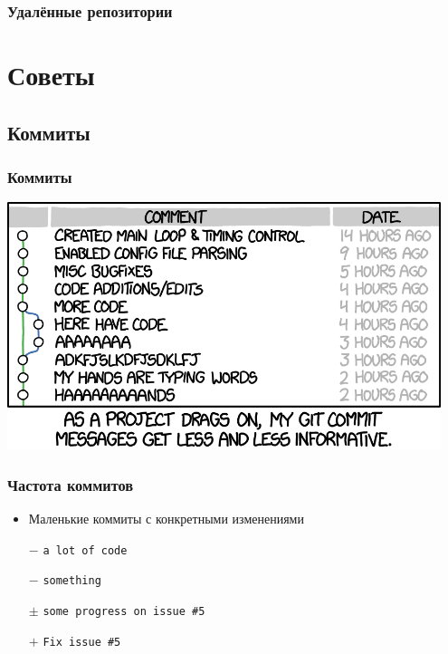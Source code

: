 \documentclass[pdf,russian,aspectratio=169]{beamer}
\begin{document}
\begin{frame}[fragile]
    \frametitle{Удалённые репозитории}
\end{frame}

\section{Советы}

\subsection{Коммиты}

\begin{frame}
    \frametitle{Коммиты}
    \pause
    \center
    \includegraphics[width=0.95\textwidth]{commits}
\end{frame}

\begin{frame}
    \frametitle{Частота коммитов}
    \begin{itemize}
        \item Маленькие коммиты с конкретными изменениями
        \pause
        \item[$-$] \texttt{a lot of code}
        \pause
        \item[$-$] \texttt{something}
        \pause
        \item[$\pm$] \texttt{some progress on issue \#{}5}
        \pause
        \item[$+$] \texttt{Fix issue \#{}5}
    \end{itemize}
\end{frame}
\end{document}
